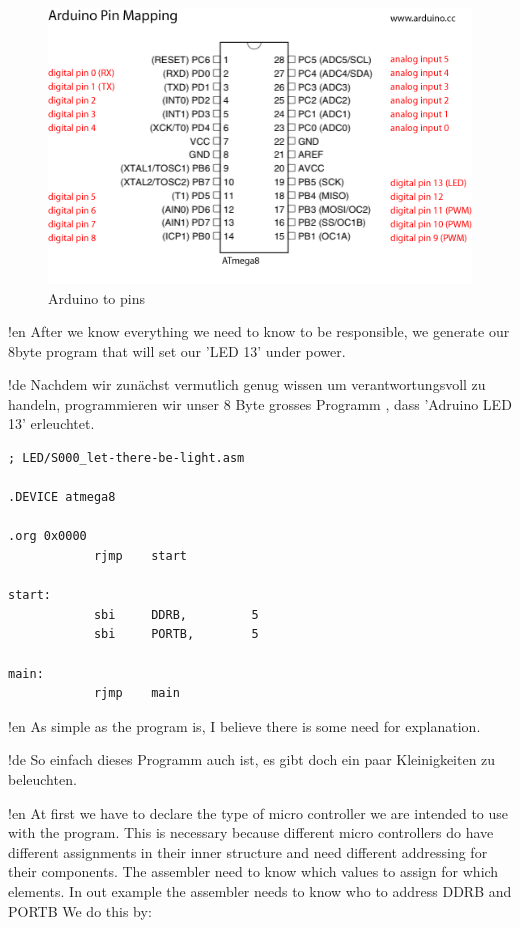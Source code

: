 \begin{figure}[htbp]
  \centering
  \includegraphics[width=120mm]{Media/www-arduino-cc_Arduino-To-Atmega8-Pins.png}
  \caption{Arduino to \at pins}
  \label{arduino-to-atmega-pins}
\end{figure}

!en After we know everything we need to know to be responsible, we generate our 8byte program that will set our 'LED 13' under power.

!de Nachdem wir zunächst vermutlich genug wissen um verantwortungsvoll zu handeln, programmieren wir unser 8 Byte grosses Programm , dass 'Adruino LED 13' erleuchtet.


\begin{lstlisting}
; LED/S000_let-there-be-light.asm

.DEVICE atmega8

.org 0x0000
            rjmp    start 

start:
            sbi     DDRB,         5
            sbi     PORTB,        5
            
main:
            rjmp    main
\end{lstlisting}

!en As simple as the program is, I believe there is some need for explanation.

!de So einfach dieses Programm auch ist, es gibt doch ein paar Kleinigkeiten zu beleuchten.



!en At first we have to declare the type of micro controller we are intended to use with the program. This is necessary because different micro controllers do have different assignments in their inner structure and need different addressing for their components. The assembler need to know which values to assign for which elements. In out example the assembler needs to know who to address DDRB and PORTB We do this by:

